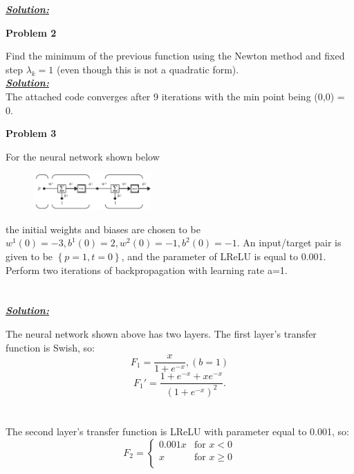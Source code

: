 \documentclass{article}
\begin{document}
\noindent \underline{\textbf{\textit{Solution:}}}

\newpage
\noindent \textbf{Problem 2}

\noindent Find the minimum of the previous function using the Newton method and fixed step $ \lambda_k = 1$ (even though this is not a quadratic form). \\

\noindent \underline{\textbf{\textit{Solution:}}} \\ 

\noindent The attached code converges after 9 iterations with the min point being (0,0) = 0.



\newpage
\noindent \textbf{Problem 3}

\noindent For the neural network shown below

\begin{figure}[h]
  \centering
  \includegraphics[width=0.4\textwidth]{pr3_a.png}
  
\end{figure}

\noindent the initial weights and biases are chosen to be $w^1(0) = -3, b^1(0) = 2, w^2(0) = -1, b^2(0) = -1$. An input/target pair is given to be ${\left \{p = 1, t=0 \right \} }$, and the parameter of LReLU is equal to 0.001. Perform two iterations of backpropagation with learning rate a=1.  \\ \\ \\


\noindent \underline{\textbf{\textit{Solution:}}}

\noindent The neural network shown above has two layers. The first layer's transfer function is Swish, so:
\[ F_1 = \frac{x}{1+e^{-x}}, (b=1) \]  
\[ F_1' = \frac{1+e^{-x} + xe^{-x}}{(1+e^{-x})^2}. \]
\\ \\The second layer's transfer function is LReLU with parameter equal to 0.001, so:
\[ F_2 = \begin{cases}
  0.001x & \text{for } x < 0 \\
  x & \text{for } x \geq 0 \\
\end{cases} \]
 
\end{document}
